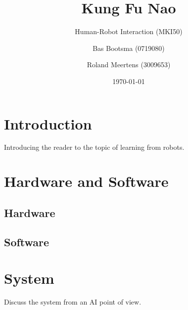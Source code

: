 \documentclass[10pt,a4paper,oneside]{scrartcl}
\begin{document}
\title{Kung Fu Nao}
\subtitle{Human-Robot Interaction (MKI50)}

\author{ Bas Bootsma (0719080) \and Roland Meertens (3009653)}

\date{\today}

\maketitle

\section{Introduction}
Introducing the reader to the topic of learning from robots. 



\section{Hardware and Software}

\subsection{Hardware}

\subsection{Software}



\section{System}
Discuss the system from an AI point of view.
\end{document}
